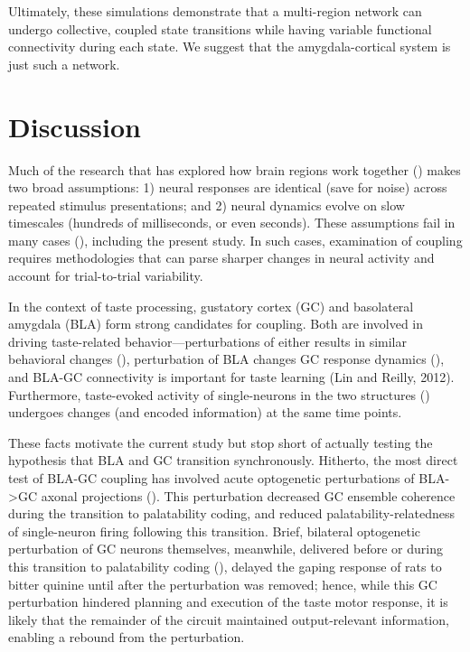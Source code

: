 \begin{refsection}
Ultimately, these simulations demonstrate that a multi-region network can undergo collective, coupled state transitions while having variable functional connectivity during each state. We suggest that the amygdala-cortical system is just such a network.

\section{Discussion}
Much of the research that has explored how brain regions work together (\cite{markov2014a,grabska-barwi2017a,yates2017a,glaser2018a}) makes two broad assumptions: 1) neural responses are identical (save for noise) across repeated stimulus presentations; and 2) neural dynamics evolve on slow timescales (hundreds of milliseconds, or even seconds). These assumptions fail in many cases (\cite{gat1997a,sugase1999a,latimer2015a,jones2007a}), including the present study. In such cases, examination of coupling requires methodologies that can parse sharper changes in neural activity and account for trial-to-trial variability.

In the context of taste processing, gustatory cortex (GC) and basolateral amygdala (BLA) form strong candidates for coupling. Both are involved in driving taste-related behavior—perturbations of either results in similar behavioral changes (\cite{lovaglio2010a,lin2011a,lin2018a}), perturbation of BLA changes GC response dynamics (\cite{piette2012a}), and BLA-GC connectivity is important for taste learning (Lin and Reilly, 2012). Furthermore, taste-evoked activity of single-neurons in the two structures (\cite{fontanini2009a,sadacca2012a}) undergoes changes (and encoded information) at the same time points. 

These facts motivate the current study but stop short of actually testing the hypothesis that BLA and GC transition synchronously. Hitherto, the most direct test of BLA-GC coupling has involved acute optogenetic perturbations of BLA->GC axonal projections (\cite{lin2021a}). This perturbation decreased GC ensemble coherence during the transition to palatability coding, and reduced palatability-relatedness of single-neuron firing following this transition. Brief, bilateral optogenetic perturbation of GC neurons themselves, meanwhile, delivered before or during this transition to palatability coding (\cite{mukherjee2019a}), delayed the gaping response of rats to bitter quinine until after the perturbation was removed; hence, while this GC perturbation hindered planning and execution of the taste motor response, it is likely that the remainder of the circuit maintained output-relevant information, enabling a rebound from the perturbation. 


\end{refsection}
